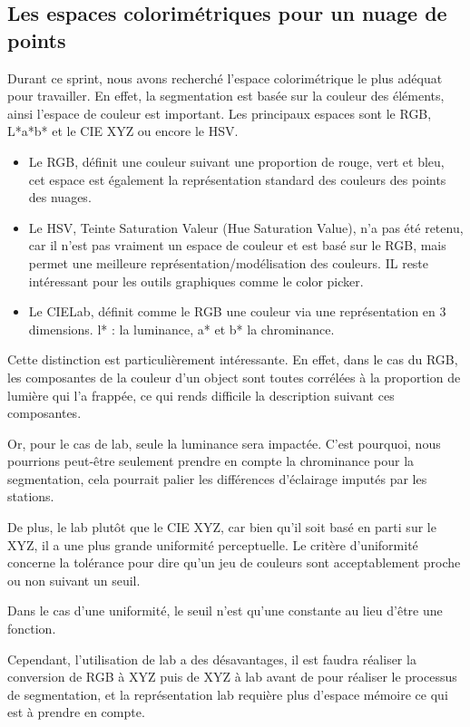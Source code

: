 \documentclass[12pt,titlepage,french]{article}
\begin{document}
\subsection{Les espaces colorimétriques pour un nuage de points}

Durant ce sprint, nous avons recherché l'espace colorimétrique le plus adéquat pour travailler.
En effet, la segmentation est basée sur la couleur des éléments, ainsi l'espace de couleur est important.
Les principaux espaces sont le RGB, L*a*b* et le CIE XYZ ou encore le HSV.
\begin{itemize}
    \item Le RGB, définit une couleur suivant une proportion de rouge, vert et bleu, cet espace est également la représentation standard des couleurs des points des nuages.
    \item Le HSV, Teinte Saturation Valeur (Hue Saturation Value), n'a pas été retenu, car il n'est pas vraiment un espace de couleur et est basé sur le RGB, mais permet une meilleure représentation/modélisation des couleurs.
IL reste intéressant pour les outils graphiques comme le color picker.
    \item Le CIELab, définit comme le RGB une couleur via une représentation en 3 dimensions. l* : la luminance, a* et b* la chrominance.
\end{itemize}
Cette distinction est particulièrement intéressante. En effet, dans le cas du RGB, les composantes de la couleur d'un object sont toutes corrélées à la proportion de lumière qui l'a frappée, ce qui rends difficile la description suivant ces composantes.

Or, pour le cas de lab, seule la luminance sera impactée. C'est pourquoi, nous pourrions peut-être seulement prendre en compte la chrominance pour la segmentation, cela pourrait palier les différences d'éclairage imputés par les stations.

De plus, le lab plutôt que le CIE XYZ, car bien qu'il soit basé en parti sur le XYZ, il a une plus grande uniformité perceptuelle. Le critère d'uniformité concerne la tolérance pour dire qu'un jeu de couleurs sont acceptablement proche ou non suivant un seuil.

Dans le cas d'une uniformité, le seuil n'est qu'une constante au lieu d'être une fonction.

Cependant, l'utilisation de lab a des désavantages, il est faudra réaliser la conversion de RGB à XYZ puis de XYZ à lab avant de pour réaliser le processus de segmentation, et la représentation lab requière plus d'espace mémoire ce qui est à prendre en compte.
\end{document}
